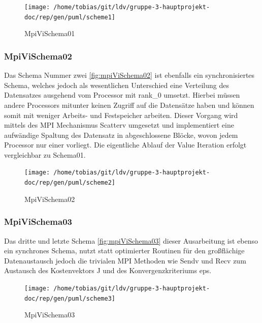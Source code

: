 \begin{figure}[h]
    \centering
    \texttt{[image: /home/tobias/git/ldv/gruppe-3-hauptprojekt-doc/rep/gen/puml/scheme1]}
    \caption{MpiViSchema01}
    \label{fig:mpiViSchema01}
\end{figure}

\subsubsection{MpiViSchema02}
Das Schema Nummer zwei \autoref{fig:mpiViSchema02} ist ebenfalls ein synchronisiertes Schema, welches jedoch als wesentlichen Unterschied eine Verteilung des Datensatzes ausgehend vom Processor mit rank\_0 umsetzt. Hierbei müssen andere Processors mitunter keinen Zugriff auf die Datensätze haben und können somit mit weniger Arbeits- und Festspeicher arbeiten. Dieser Vorgang wird mittels des MPI Mechanismus Scatterv umgesetzt und implementiert eine aufwändige Spaltung des Datensatz in abgeschlossene Blöcke, wovon jedem Processor nur einer vorliegt. Die eigentliche Ablauf der Value Iteration erfolgt vergleichbar zu Schema01.

\begin{figure}[h]
    \centering
    \texttt{[image: /home/tobias/git/ldv/gruppe-3-hauptprojekt-doc/rep/gen/puml/scheme2]}
    \caption{MpiViSchema02}
    \label{fig:mpiViSchema02}
\end{figure}

\subsubsection{MpiViSchema03}
Das dritte und letzte Schema \autoref{fig:mpiViSchema03} dieser Ausarbeitung ist ebenso ein synchrones Schema, nutzt statt optimierter Routinen für den großflächige Datenaustausch jedoch die trivialen MPI Methoden wie Sendv und Recv zum Austausch des Kostenvektors J und des Konvergenzkriteriums eps.

\begin{figure}[h]
    \centering
    \texttt{[image: /home/tobias/git/ldv/gruppe-3-hauptprojekt-doc/rep/gen/puml/scheme3]}
    \caption{MpiViSchema03}
    \label{fig:mpiViSchema03}
\end{figure}


